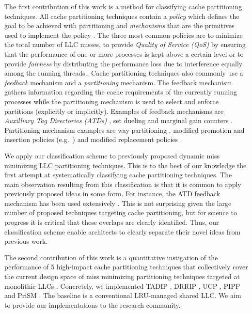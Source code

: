 The first contribution of this work is a method for classifying cache partitioning techniques.
All cache partitioning techniques contain a \textit{policy} which defines the goal to be achieved with partitioning and \textit{mechanisms} that are the primitives used to implement the policy \cite{virtualPrivateMachines}.
The three most common policies are to minimize the total number of LLC misses, to provide \textit{Quality of Service (QoS)} by ensuring that the performance of one or more processes is kept above a certain level or to provide \textit{fairness} by distributing the performance loss due to interference equally among the running threads..
Cache partitioning techniques also commonly use a \textit{feedback} mechanism and a \textit{partitioning} mechanism.
The feedback mechanism gathers information regarding the cache requirements of the currently running processes while the partitioning mechanism is used to select and enforce partitions (explicitly or implicitly).
Examples of feedback mechanisms are \textit{Auxilliary Tag Directories (ATDs)} \cite{utilityBasedCachePartitioning,haakonHiPC}, set dueling \cite{jaleel10} and marginal gain counters \cite{dynPartofSharedCacheMemory,suh02}.
Partitioning mechanism examples are way partitioning  \cite{utilityBasedCachePartitioning}, modified promotion and insertion policies (e.g.\ \cite{xie09}) and modified replacement policies \cite{jaleel10, albericio13}.

We apply our classification scheme to previously proposed dynamic miss minimizing LLC partitioning techniques.
This is to the best of our knowledge the first attempt at systematically classifying cache partitioning techniques.
The main observation resulting from this classification is that it is common to apply previously proposed ideas in some form.
For instance, the ATD feedback mechanism has been used extensively \cite{utilityBasedCachePartitioning,haakonHiPC,xie09,xie10,sanchez11,sundararajan12,manikantan12}.
This is not surprising given the large number of proposed techniques targeting cache partitioning, but for science to progress it is critical that these overlaps are clearly identified.
Thus, our classification scheme enable architects to clearly separate their novel ideas from previous work.

The second contribution of this work is a quantitative instigation of the performance of 5 high-impact cache partitioning techniques that collectively cover the current design space of miss minimizing partitioning techniques targeted at monolithic LLCs .
Concretely, we implemented TADIP \cite{jaleel08}, DRRIP \cite{jaleel10}, UCP \cite{utilityBasedCachePartitioning}, PIPP \cite{xie09} and PriSM \cite{manikantan12}.
The baseline is a conventional LRU-managed shared LLC.
We aim to provide our implementations to the research community.


